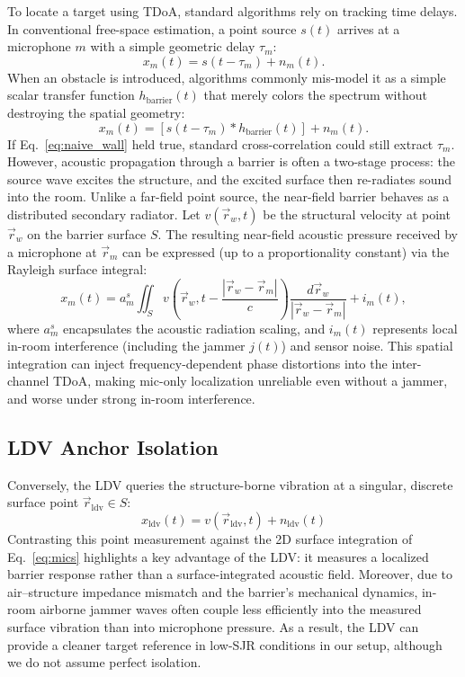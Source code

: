 \documentclass{Interspeech}
\begin{document}
To locate a target using TDoA, standard algorithms rely on tracking time delays. In conventional free-space estimation, a point source $s(t)$ arrives at a microphone $m$ with a simple geometric delay $\tau_m$:
\begin{equation}
  x_{m}(t) = s(t - \tau_m) + n_m(t). \label{eq:free_space}
\end{equation}
When an obstacle is introduced, algorithms commonly mis-model it as a simple scalar transfer function $h_{\text{barrier}}(t)$ that merely colors the spectrum without destroying the spatial geometry:
\begin{equation}
  x_{m}(t) = \left[ s(t - \tau_m) * h_{\text{barrier}}(t) \right] + n_m(t). \label{eq:naive_wall}
\end{equation}
If Eq.~\ref{eq:naive_wall} held true, standard cross-correlation could still extract $\tau_m$. However, acoustic propagation through a barrier is often a two-stage process: the source wave excites the structure, and the excited surface then re-radiates sound into the room. Unlike a far-field point source, the near-field barrier behaves as a distributed secondary radiator. Let $v(\vec{r}_w, t)$ be the structural velocity at point $\vec{r}_w$ on the barrier surface $S$. The resulting near-field acoustic pressure received by a microphone at $\vec{r}_m$ can be expressed (up to a proportionality constant) via the Rayleigh surface integral:
%
\begin{equation}
  x_{m}(t) = a_m^{s} \iint_S v\left(\vec{r}_w, t - \frac{|\vec{r}_w - \vec{r}_m|}{c}\right) \frac{d\vec{r}_w}{|\vec{r}_w - \vec{r}_m|} + i_m(t), \label{eq:mics}
\end{equation}
%
where $a_m^s$ encapsulates the acoustic radiation scaling, and $i_m(t)$ represents local in-room interference (including the jammer $j(t)$) and sensor noise. This spatial integration can inject frequency-dependent phase distortions into the inter-channel TDoA, making mic-only localization unreliable even without a jammer, and worse under strong in-room interference.

\subsection{LDV Anchor Isolation}
\label{sec:ldv_isol}

Conversely, the LDV queries the structure-borne vibration at a singular, discrete surface point $\vec{r}_{\text{ldv}} \in S$:
%
\begin{equation}
  x_{\text{ldv}}(t)  = v(\vec{r}_{\text{ldv}}, t) + n_{\text{ldv}}(t)
  \label{eq:ldv}
\end{equation}
%
Contrasting this point measurement against the 2D surface integration of Eq.~\ref{eq:mics} highlights a key advantage of the LDV: it measures a localized barrier response rather than a surface-integrated acoustic field. Moreover, due to air--structure impedance mismatch and the barrier's mechanical dynamics, in-room airborne jammer waves often couple less efficiently into the measured surface vibration than into microphone pressure. As a result, the LDV can provide a cleaner target reference in low-SJR conditions in our setup, although we do not assume perfect isolation.
\end{document}
